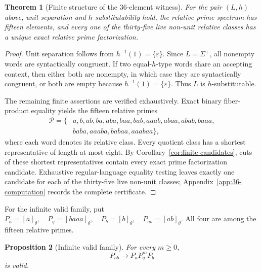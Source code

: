 \documentclass[11pt,a4paper]{article}
\newtheorem{theorem}{Theorem}[section]
\newtheorem{proposition}[theorem]{Proposition}
\newcommand{\eps}{\varepsilon}
\newcommand{\Pcal}{\mathcal P}
\begin{document}
\begin{theorem}[Finite structure of the $36$-element witness]
\label{thm:36-finite-structure}
For the pair $(L,h)$ above, unit separation and $h$-substitutability hold, the relative prime spectrum has fifteen elements, and every one of the thirty-five live non-unit relative classes has a unique exact relative prime factorization.
\end{theorem}

\begin{proof}
Unit separation follows from $h^{-1}(1)=\{\eps\}$.  Since $L=\Sigma^+$, all nonempty words are syntactically congruent.  If two equal-$h$-type words share an accepting context, then either both are nonempty, in which case they are syntactically congruent, or both are empty because $h^{-1}(1)=\{\eps\}$.  Thus $L$ is $h$-substitutable.

The remaining finite assertions are verified exhaustively.  Exact binary fiber-product equality yields the fifteen relative primes
\[
\begin{aligned}
\Pcal=\{&a,b,ab,ba,aba,baa,bab,aaab,abaa,abab,baaa,\\
&baba,aaaba,babaa,aaabaa\},
\end{aligned}
\]
where each word denotes its relative class.  Every quotient class has a shortest representative of length at most eight.  By Corollary~\ref{cor:finite-candidates}, cuts of these shortest representatives contain every exact prime factorization candidate.  Exhaustive regular-language equality testing leaves exactly one candidate for each of the thirty-five live non-unit classes; Appendix~\ref{app:36-computation} records the complete certificate.
\end{proof}

For the infinite valid family, put
\(P_a=[a]_\theta,\quad P_q=[baaa]_\theta,\quad P_b=[b]_\theta,\quad P_{ab}=[ab]_\theta.\)
All four are among the fifteen relative primes.

\begin{proposition}[Infinite valid family]
For every $m\ge0$,
\[
  \boxed{
  P_{ab}\to P_aP_q^mP_b
  }
\]
is valid.
\end{proposition}
\end{document}
